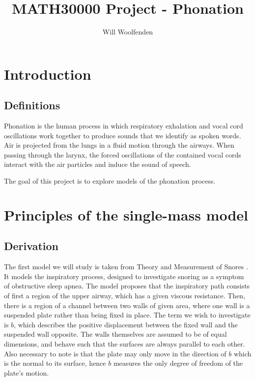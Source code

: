 \documentclass{article}
\title{MATH30000 Project - Phonation}
\author{Will Woolfenden}
\begin{document}
\maketitle

\section{Introduction}

\subsection{Definitions}

Phonation is the human process in which respiratory exhalation and vocal cord oscillations work together to produce sounds that we identify as spoken words.
Air is projected from the lungs in a fluid motion through the airways.
When passing through the larynx, the forced oscillations of the contained vocal cords interact with the air particles and induce the sound of speech.

The goal of this project is to explore models of the phonation process.



\section{Principles of the single-mass model}

\subsection{Derivation}


The first model we will study is taken from Theory and Measurement of Snores \citep{gavriely_jensen_1993}.
It models the inspiratory process, designed to investigate snoring as a symptom of obstructive sleep apnea.
The model proposes that the inspiratory path consists of first a region of the upper airway,
which has a given viscous resistance.
Then, there is a region of a channel between two walls of given area, where one wall is a suspended plate rather than being fixed in place.
The term we wish to investigate is $b$, which describes the positive displacement between the fixed wall and the suspended wall opposite.
The walls themselves are assumed to be of equal dimensions, and behave such that the surfaces are always parallel to each other.
Also necessary to note is that the plate may only move in the direction of $b$ which is the normal to its surface,
hence $b$ measures the only degree of freedom of the plate's motion.
\end{document}

